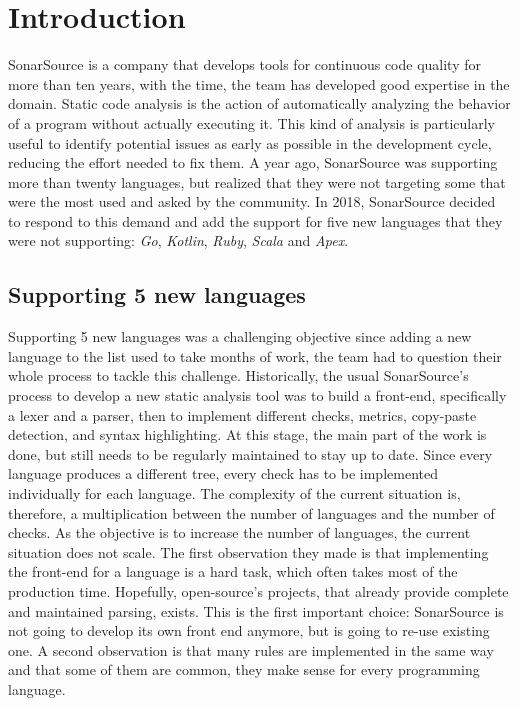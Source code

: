 \section{Introduction}
\label{sec:introduction}
SonarSource is a company that develops tools for continuous code quality for more than ten years, with the time, the team has developed good expertise in the domain.
Static code analysis is the action of automatically analyzing the behavior of a program without actually executing it.
This kind of analysis is particularly useful to identify potential issues as early as possible in the development cycle, reducing the effort needed to fix them.
A year ago, SonarSource was supporting more than twenty languages, but realized that they were not targeting some that were the most used and asked by the community.
In 2018, SonarSource decided to respond to this demand and add the support for five new languages that they were not supporting: \emph{Go}, \emph{Kotlin}, \emph{Ruby}, \emph{Scala} and \emph{Apex}.

\subsection{Supporting 5 new languages}
\label{subsec:5_new_languages}
Supporting 5 new languages was a challenging objective since adding a new language to the list used to take months of work, the team had to question their whole process to tackle this challenge.
Historically, the usual SonarSource's process to develop a new static analysis tool was to build a front-end, specifically a lexer and a parser, then to implement different checks, metrics, copy-paste detection, and syntax highlighting. 
At this stage, the main part of the work is done, but still needs to be regularly maintained to stay up to date.
Since every language produces a different tree, every check has to be implemented individually for each language.
The complexity of the current situation is, therefore, a multiplication between the number of languages and the number of checks.
As the objective is to increase the number of languages, the current situation does not scale.
The first observation they made is that implementing the front-end for a language is a hard task, which often takes most of the production time. 
Hopefully, open-source's projects, that already provide complete and maintained parsing, exists. 
This is the first important choice: SonarSource is not going to develop its own front end anymore, but is going to re-use existing one.
A second observation is that many rules are implemented in the same way and that some of them are common, they make sense for every programming language.


